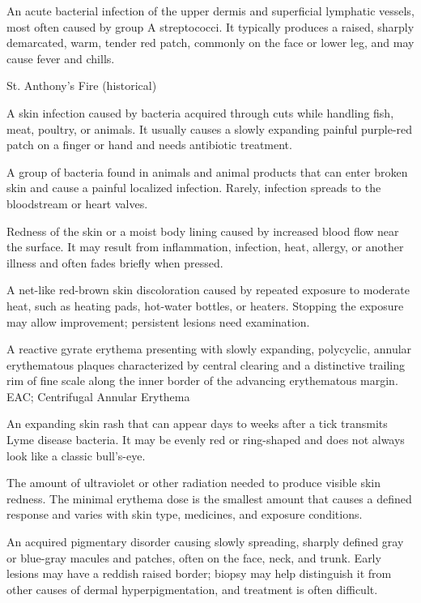  An acute bacterial infection of the upper dermis and superficial lymphatic vessels, most often caused by group A streptococci. It typically produces a raised, sharply demarcated, warm, tender red patch, commonly on the face or lower leg, and may cause fever and chills.

\synonyms
St. Anthony's Fire (historical)

 A skin infection caused by bacteria acquired through cuts while handling fish, meat, poultry, or animals. It usually causes a slowly expanding painful purple-red patch on a finger or hand and needs antibiotic treatment.

 A group of bacteria found in animals and animal products that can enter broken skin and cause a painful localized infection. Rarely, infection spreads to the bloodstream or heart valves.

 Redness of the skin or a moist body lining caused by increased blood flow near the surface. It may result from inflammation, infection, heat, allergy, or another illness and often fades briefly when pressed.

 A net-like red-brown skin discoloration caused by repeated exposure to moderate heat, such as heating pads, hot-water bottles, or heaters. Stopping the exposure may allow improvement; persistent lesions need examination.

 A reactive gyrate erythema presenting with slowly expanding, polycyclic, annular erythematous plaques characterized by central clearing and a distinctive trailing rim of fine scale along the inner border of the advancing erythematous margin.
\synonyms
EAC; Centrifugal Annular Erythema

 An expanding skin rash that can appear days to weeks after a tick transmits Lyme disease bacteria. It may be evenly red or ring-shaped and does not always look like a classic bull’s-eye.

 The amount of ultraviolet or other radiation needed to produce visible skin redness. The minimal erythema dose is the smallest amount that causes a defined response and varies with skin type, medicines, and exposure conditions.

 An acquired pigmentary disorder causing slowly spreading, sharply defined gray or blue-gray macules and patches, often on the face, neck, and trunk. Early lesions may have a reddish raised border; biopsy may help distinguish it from other causes of dermal hyperpigmentation, and treatment is often difficult.

